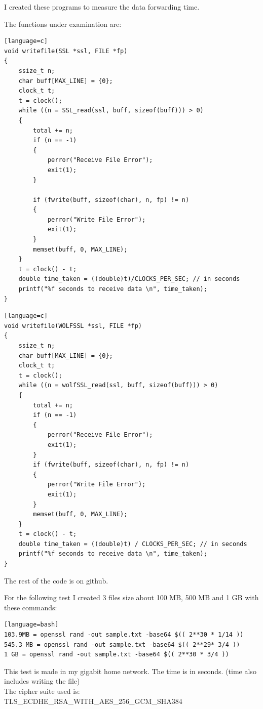 \documentclass[a4paper,12pt]{article}
\begin{document}
I created these programs to measure the data forwarding time.

The functions under examination are:

\begin{lstlisting}[caption={openSSL function},captionpos=b][language=c]
void writefile(SSL *ssl, FILE *fp)
{
    ssize_t n;
    char buff[MAX_LINE] = {0};
    clock_t t; 
    t = clock(); 
    while ((n = SSL_read(ssl, buff, sizeof(buff))) > 0)
    {
        total += n;
        if (n == -1)
        {
            perror("Receive File Error");
            exit(1);
        }

        if (fwrite(buff, sizeof(char), n, fp) != n)
        {
            perror("Write File Error");
            exit(1);
        }
        memset(buff, 0, MAX_LINE);
    }
    t = clock() - t; 
    double time_taken = ((double)t)/CLOCKS_PER_SEC; // in seconds 
    printf("%f seconds to receive data \n", time_taken); 
}
\end{lstlisting}

\begin{lstlisting}[caption={wolfSSL function},captionpos=b][language=c]
void writefile(WOLFSSL *ssl, FILE *fp)
{
    ssize_t n;
    char buff[MAX_LINE] = {0};
    clock_t t;
    t = clock();
    while ((n = wolfSSL_read(ssl, buff, sizeof(buff))) > 0)
    {
        total += n;
        if (n == -1)
        {
            perror("Receive File Error");
            exit(1);
        }
        if (fwrite(buff, sizeof(char), n, fp) != n)
        {
            perror("Write File Error");
            exit(1);
        }
        memset(buff, 0, MAX_LINE);
    }
    t = clock() - t;
    double time_taken = ((double)t) / CLOCKS_PER_SEC; // in seconds
    printf("%f seconds to receive data \n", time_taken);
}
\end{lstlisting}
The rest of the code is on github.

For the following test I created 3 files size about 100 MB, 500 MB and 1 GB with these commands:
\begin{lstlisting}[caption={openSSL commands},captionpos=b][language=bash]
103.9MB = openssl rand -out sample.txt -base64 $(( 2**30 * 1/14 ))
545.3 MB = openssl rand -out sample.txt -base64 $(( 2**29* 3/4 ))
1 GB = openssl rand -out sample.txt -base64 $(( 2**30 * 3/4 ))
\end{lstlisting}

This test is made in my gigabit home network.
The time is in seconds. (time also includes writing the file)
\\The cipher suite used is: TLS\_ECDHE\_RSA\_WITH\_AES\_256\_GCM\_SHA384
\end{document}
